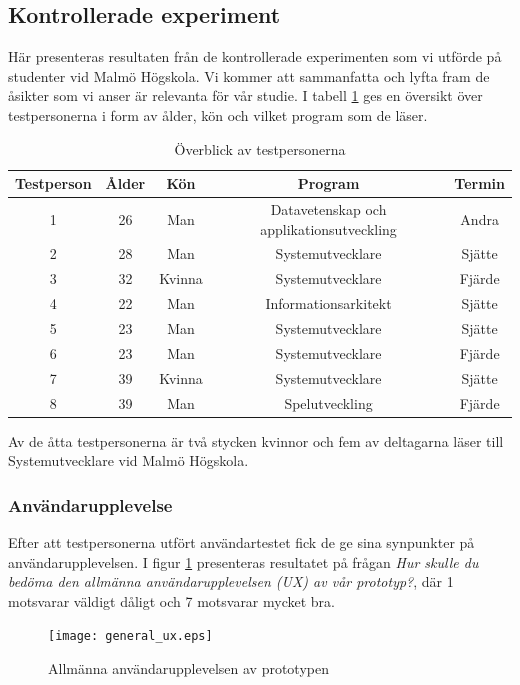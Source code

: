 \documentclass[a4paper,11pt]{article}
\begin{document}
{\newpage
\subsection{Kontrollerade experiment} \label{experiment}

Här presenteras resultaten från de kontrollerade experimenten som vi utförde på studenter vid Malmö Högskola. Vi kommer att sammanfatta och lyfta fram de åsikter som vi anser är relevanta för vår studie. I tabell \ref{tab:Testpersoner} ges en översikt över testpersonerna i form av ålder, kön och vilket program som de läser.

\begin{table}[h!]
	\centering
	\caption{Överblick av testpersonerna}
	\label{tab:Testpersoner}
	\begin{tabular}{c c c c c}
		\toprule
		Testperson & Ålder & Kön & Program & Termin\\
		\midrule
		1 & 26 & Man & Datavetenskap och applikationsutveckling & Andra\\
		2 & 28 & Man & Systemutvecklare & Sjätte\\
		3 & 32 & Kvinna & Systemutvecklare & Fjärde\\
		4 & 22 & Man & Informationsarkitekt & Sjätte\\
		5 & 23 & Man & Systemutvecklare & Sjätte\\
		6 & 23 & Man & Systemutvecklare & Fjärde\\
		7 & 39 & Kvinna & Systemutvecklare & Sjätte\\
		8 & 39 & Man & Spelutveckling & Fjärde\\
		\bottomrule
	\end{tabular}
\end{table}

Av de åtta testpersonerna är två stycken kvinnor och fem av deltagarna läser till Systemutvecklare vid Malmö Högskola.

\subsubsection{Användarupplevelse}
Efter att testpersonerna utfört användartestet fick de ge sina synpunkter på användarupplevelsen. I figur \ref{fig:GeneralUX} presenteras resultatet på frågan \textit{Hur skulle du bedöma den allmänna användarupplevelsen (UX) av vår prototyp?}, där 1 motsvarar väldigt dåligt och 7 motsvarar mycket bra.

\begin{figure}[ht!]
\centering
\texttt{[image: general\_ux.eps]}
\caption{Allmänna användarupplevelsen av prototypen}
\label{fig:GeneralUX}
\end{figure}

}
\end{document}

